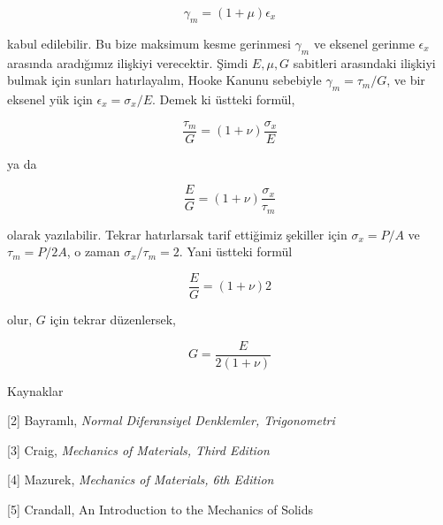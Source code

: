 \documentclass[12pt,fleqn]{article}\usepackage{../../common}
\begin{document}
$$
\gamma_m = (1+\mu) \epsilon_x
$$

kabul edilebilir. Bu bize maksimum kesme gerinmesi $\gamma_m$ ve eksenel gerinme
$\epsilon_x$ arasında aradığımız ilişkiyi verecektir. Şimdi $E,\mu,G$ sabitleri
arasındaki ilişkiyi bulmak için sunları hatırlayalım, Hooke Kanunu sebebiyle
$\gamma_m = \tau_m / G$, ve bir eksenel yük için $\epsilon_x = \sigma_x /
E$. Demek ki üstteki formül,

$$
\frac{\tau_m}{G} = (1+\nu) \frac{\sigma_x}{E}
$$

ya da

$$
\frac{E}{G} = (1+\nu) \frac{\sigma_x}{\tau_m}
$$

olarak yazılabilir. Tekrar hatırlarsak tarif ettiğimiz şekiller için
$\sigma_x = P / A$ ve $\tau_m = P / 2A$, o zaman $\sigma_x / \tau_m = 2$.
Yani üstteki formül

$$
\frac{E}{G} = (1+\nu) 2
$$

olur, $G$ için tekrar düzenlersek,

$$
G = \frac{E}{2(1+\nu)}
$$

Kaynaklar

[2] Bayramlı, {\em Normal Diferansiyel Denklemler, Trigonometri}

[3] Craig, {\em Mechanics of Materials, Third Edition}

[4] Mazurek, {\em Mechanics of Materials, 6th Edition}

[5] Crandall, An Introduction to the Mechanics of Solids
\end{document}

